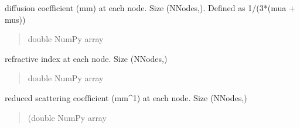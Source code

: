 \documentclass[letterpaper,10pt,english]{sphinxmanual}
\begin{document}
\begin{fulllineitems}
\begin{fulllineitems}
\begin{quote}
\begin{description}
\end{description}\end{quote}

\end{fulllineitems}


\begin{fulllineitems}
\label{\detokenize{_autosummary/nirfasterff.base.stnd_mesh.stndmesh:nirfasterff.base.stnd_mesh.stndmesh.kappa}}
\pysigstartsignatures
\pysigline
{}
\pysigstopsignatures
\sphinxAtStartPar
diffusion coefficient (mm) at each node. Size (NNodes,). Defined as 1/(3*(mua + mus))
\begin{quote}\begin{description}
\sphinxAtStartPar
double NumPy array

\end{description}\end{quote}

\end{fulllineitems}


\begin{fulllineitems}
\label{\detokenize{_autosummary/nirfasterff.base.stnd_mesh.stndmesh:nirfasterff.base.stnd_mesh.stndmesh.ri}}
\pysigstartsignatures
\pysigline
{}
\pysigstopsignatures
\sphinxAtStartPar
refractive index at each node. Size (NNodes,)
\begin{quote}\begin{description}
\sphinxAtStartPar
double NumPy array

\end{description}\end{quote}

\end{fulllineitems}


\begin{fulllineitems}
\label{\detokenize{_autosummary/nirfasterff.base.stnd_mesh.stndmesh:nirfasterff.base.stnd_mesh.stndmesh.mus}}
\pysigstartsignatures
\pysigline
{}
\pysigstopsignatures
\sphinxAtStartPar
reduced scattering coefficient (mm\textasciicircum{}\sphinxhyphen{}1) at each node. Size (NNodes,)
\begin{quote}\begin{description}
\sphinxAtStartPar
(double NumPy array


\end{description}
\end{quote}
\end{fulllineitems}
\end{fulllineitems}
\end{document}

